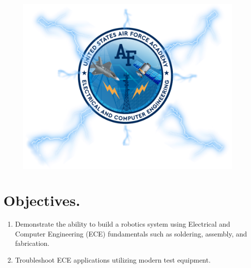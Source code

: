 \documentclass{handout}
\begin{document}
	\maketitle
	
	\begin{figure}[H]
		\centering
		\includegraphics[width=.75\textwidth]{Cover.png}
	\end{figure}
	
	\section{Objectives.} 
	\begin{enumerate}
		\item Demonstrate the ability to build a robotics system using Electrical and Computer Engineering (ECE) fundamentals such as soldering, assembly, and fabrication.
		\item Troubleshoot ECE applications utilizing modern test equipment.
	\end{enumerate}
	
\end{document}
